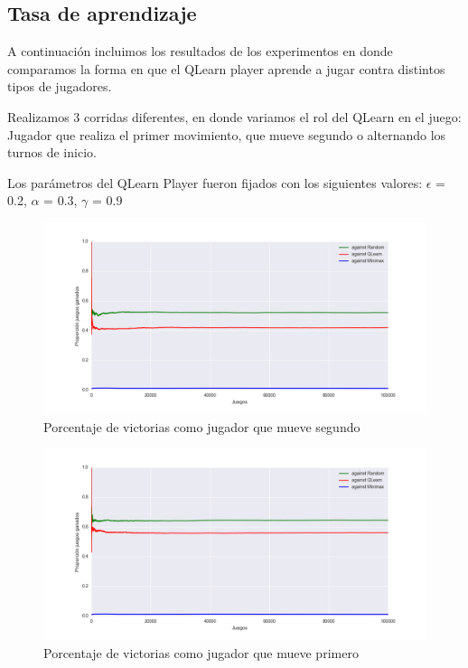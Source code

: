 \subsection{Tasa de aprendizaje}

A continuación incluimos los resultados de los experimentos en donde comparamos la forma en que el
QLearn player aprende a jugar contra distintos tipos de jugadores.

Realizamos 3 corridas diferentes, en donde variamos el rol del QLearn en el juego: Jugador
que realiza el primer movimiento, que mueve segundo o alternando los turnos de inicio.

Los parámetros del QLearn Player fueron fijados con los siguientes valores:
$\epsilon$ = 0.2, $\alpha$ = 0.3, $\gamma$ = 0.9

\begin{figure}[H]
	\centerline{\includegraphics[width=1.3\textwidth]{figures/learning_rate_as_second_player.png}}
	\caption{Porcentaje de victorias como jugador que mueve segundo}
\end{figure}

\begin{figure}[H]
	\centerline{\includegraphics[width=1.3\textwidth]{figures/learning_rate_as_first_player.png}}
	\caption{Porcentaje de victorias como jugador que mueve primero}
\end{figure}

